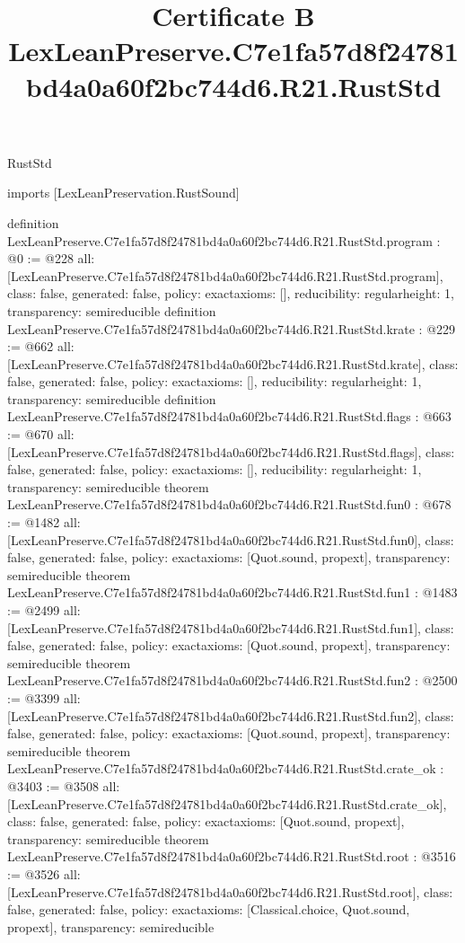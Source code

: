 \begin{lexlean}{RustStd}
\title{Certificate B LexLeanPreserve.C7e1fa57d8f24781bd4a0a60f2bc744d6.R21.RustStd}
\begin{coremodule}
imports [LexLeanPreservation.RustSound]

definition LexLeanPreserve.C7e1fa57d8f24781bd4a0a60f2bc744d6.R21.RustStd.program : @0 := @228 {
  all: [LexLeanPreserve.C7e1fa57d8f24781bd4a0a60f2bc744d6.R21.RustStd.program],
  class: false,
  generated: false,
  policy: exact{axioms: []},
  reducibility: regular{height: 1},
  transparency: semireducible
}
definition LexLeanPreserve.C7e1fa57d8f24781bd4a0a60f2bc744d6.R21.RustStd.krate : @229 := @662 {
  all: [LexLeanPreserve.C7e1fa57d8f24781bd4a0a60f2bc744d6.R21.RustStd.krate],
  class: false,
  generated: false,
  policy: exact{axioms: []},
  reducibility: regular{height: 1},
  transparency: semireducible
}
definition LexLeanPreserve.C7e1fa57d8f24781bd4a0a60f2bc744d6.R21.RustStd.flags : @663 := @670 {
  all: [LexLeanPreserve.C7e1fa57d8f24781bd4a0a60f2bc744d6.R21.RustStd.flags],
  class: false,
  generated: false,
  policy: exact{axioms: []},
  reducibility: regular{height: 1},
  transparency: semireducible
}
theorem LexLeanPreserve.C7e1fa57d8f24781bd4a0a60f2bc744d6.R21.RustStd.fun0 : @678 := @1482 {
  all: [LexLeanPreserve.C7e1fa57d8f24781bd4a0a60f2bc744d6.R21.RustStd.fun0],
  class: false,
  generated: false,
  policy: exact{axioms: [Quot.sound, propext]},
  transparency: semireducible
}
theorem LexLeanPreserve.C7e1fa57d8f24781bd4a0a60f2bc744d6.R21.RustStd.fun1 : @1483 := @2499 {
  all: [LexLeanPreserve.C7e1fa57d8f24781bd4a0a60f2bc744d6.R21.RustStd.fun1],
  class: false,
  generated: false,
  policy: exact{axioms: [Quot.sound, propext]},
  transparency: semireducible
}
theorem LexLeanPreserve.C7e1fa57d8f24781bd4a0a60f2bc744d6.R21.RustStd.fun2 : @2500 := @3399 {
  all: [LexLeanPreserve.C7e1fa57d8f24781bd4a0a60f2bc744d6.R21.RustStd.fun2],
  class: false,
  generated: false,
  policy: exact{axioms: [Quot.sound, propext]},
  transparency: semireducible
}
theorem LexLeanPreserve.C7e1fa57d8f24781bd4a0a60f2bc744d6.R21.RustStd.crate_ok : @3403 := @3508 {
  all: [LexLeanPreserve.C7e1fa57d8f24781bd4a0a60f2bc744d6.R21.RustStd.crate_ok],
  class: false,
  generated: false,
  policy: exact{axioms: [Quot.sound, propext]},
  transparency: semireducible
}
theorem LexLeanPreserve.C7e1fa57d8f24781bd4a0a60f2bc744d6.R21.RustStd.root : @3516 := @3526 {
  all: [LexLeanPreserve.C7e1fa57d8f24781bd4a0a60f2bc744d6.R21.RustStd.root],
  class: false,
  generated: false,
  policy: exact{axioms: [Classical.choice, Quot.sound, propext]},
  transparency: semireducible
}


\end{coremodule}
\end{lexlean}
